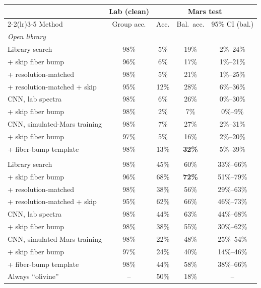 \begin{tabular}{lcccc}
\toprule
 & Lab (clean) & \multicolumn{3}{c}{Mars test} \\
\cmidrule(lr){2-2}\cmidrule(lr){3-5}
Method & Group acc. & Acc. & Bal.\ acc. & 95\% CI (bal.) \\
\midrule
\multicolumn{5}{l}{\emph{Open library}}\\
Library search & 98\% & 5\% & 19\% & 2\%--24\%\\
\quad + skip fiber bump & 96\% & 6\% & 17\% & 1\%--21\%\\
\quad + resolution-matched & 98\% & 5\% & 21\% & 1\%--25\%\\
\quad + resolution-matched + skip & 95\% & 12\% & 28\% & 6\%--36\%\\
CNN, lab spectra & 98\% & 6\% & 26\% & 0\%--30\%\\
\quad + skip fiber bump & 98\% & 2\% & 7\% & 0\%--9\%\\
CNN, simulated-Mars training & 98\% & 7\% & 27\% & 2\%--31\%\\
\quad + skip fiber bump & 97\% & 5\% & 16\% & 2\%--20\%\\
\quad + fiber-bump template & 98\% & 13\% & \textbf{32\%} & 5\%--39\%\\
\addlinespace
\multicolumn{5}{l}{\emph{Mars-candidate library}}\\
Library search & 98\% & 45\% & 60\% & 33\%--66\%\\
\quad + skip fiber bump & 96\% & 68\% & \textbf{72\%} & 51\%--79\%\\
\quad + resolution-matched & 98\% & 38\% & 56\% & 29\%--63\%\\
\quad + resolution-matched + skip & 95\% & 62\% & 66\% & 46\%--73\%\\
CNN, lab spectra & 98\% & 44\% & 63\% & 44\%--68\%\\
\quad + skip fiber bump & 98\% & 38\% & 55\% & 30\%--62\%\\
CNN, simulated-Mars training & 98\% & 22\% & 48\% & 25\%--54\%\\
\quad + skip fiber bump & 97\% & 24\% & 40\% & 14\%--46\%\\
\quad + fiber-bump template & 98\% & 44\% & 58\% & 38\%--66\%\\
\addlinespace
Always ``olivine'' & -- & 50\% & 18\% & -- \\
\bottomrule
\end{tabular}

